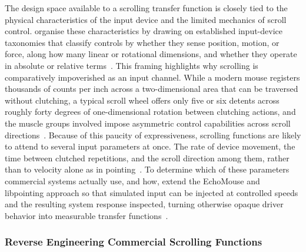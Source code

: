 \documentclass[12pt,a4paper]{report}
\begin{document}
        The design space available to a scrolling transfer function is closely tied to the physical characteristics of the input device and the limited mechanics of scroll control. \citeauthor{quinn2012exposing} organise these characteristics by drawing on established input-device taxonomies that classify controls by whether they sense position, motion, or force, along how many linear or rotational dimensions, and whether they operate in absolute or relative terms~\cite{quinn2012exposing}. This framing highlights why scrolling is comparatively impoverished as an input channel. While a modern mouse registers thousands of counts per inch across a two-dimensional area that can be traversed without clutching, a typical scroll wheel offers only five or six detents across roughly forty degrees of one-dimensional rotation between clutching actions, and the muscle groups involved impose asymmetric control capabilities across scroll directions~\cite{quinn2012exposing}. Because of this paucity of expressiveness, scrolling functions are likely to attend to several input parameters at once. The rate of device movement, the time between clutched repetitions, and the scroll direction among them, rather than to velocity alone as in pointing~\cite{quinn2012exposing}. To determine which of these parameters commercial systems actually use, and how, \citeauthor{quinn2012exposing} extend the EchoMouse and libpointing approach so that simulated input can be injected at controlled speeds and the resulting system response inspected, turning otherwise opaque driver behavior into measurable transfer functions~\cite{quinn2012exposing}. 

        \subsubsection{Reverse Engineering Commercial Scrolling Functions}
\end{document}

